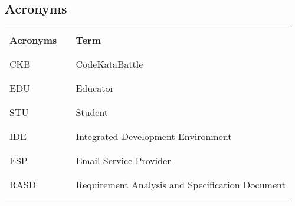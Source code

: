 \subsection{Acronyms}
\begin{table}[H]
    \centering
    \renewcommand{\arraystretch}{0.5}
    \begin{tabular}{l l p{11cm}}
        \hline
                          &        &                                                        \\
        \textbf{Acronyms} & \vline & \textbf{Term}                                          \\
                          &        &                                                        \\\hline \\
        CKB               & \vline & CodeKataBattle                                         \\
                          &        &                                                        \\\hline \\
        EDU               & \vline & Educator                                               \\
                          &        &                                                        \\\hline \\
        STU               & \vline & Student                                                \\
                          &        &                                                        \\\hline \\
        IDE               & \vline & Integrated Development Environment                     \\
                          &        &                                                        \\\hline \\
        ESP               & \vline & Email Service Provider                                 \\
                          &        &                                                        \\\hline \\
        RASD              & \vline & Requirement Analysis and Specification Document        \\
                          &        &                                                        \\\hline \\

\end{tabular}
\end{table}
